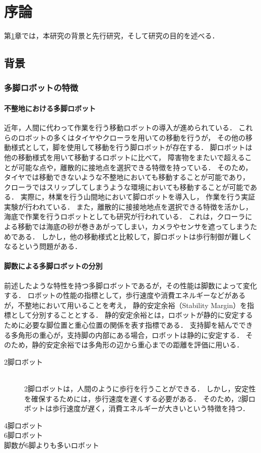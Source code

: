 ﻿
\chapter{序論}\label{chapter:序論}
第\ref{chapter:序論}章では，本研究の背景と先行研究，そして研究の目的を述べる．


\section{背景}
\subsection{多脚ロボットの特徴}
\subsubsection{不整地における多脚ロボット}
近年，人間に代わって作業を行う移動ロボットの導入が進められている．
これらのロボットの多くはタイヤやクローラを用いての移動を行うが，
その他の移動様式として，脚を使用して移動を行う脚ロボットが存在する．
脚ロボットは他の移動様式を用いて移動するロボットに比べて，
障害物をまたいで超えることが可能な点や，離散的に接地点を選択できる特徴を持っている\cite{Locomotion_for_difficult_terrain}．
そのため，タイヤでは移動できないような不整地においても移動することが可能であり，
クローラではスリップしてしまうような環境においても移動することが可能である．
実際に，林業を行う山間地において脚ロボットを導入し，
作業を行う実証実験が行われている\cite{NEDO}．
また，離散的に接接地地点を選択できる特徴を活かし，海底で作業を行うロボットとしても研究が行われている．
これは，クローラによる移動では海底の砂が巻きあがってしまい，カメラやセンサを遮ってしまうためである．
しかし，他の移動様式と比較して，脚ロボットは歩行制御が難しくなるという問題がある．

\subsubsection{脚数による多脚ロボットの分別}
前述したような特性を持つ多脚ロボットであるが，その性能は脚数によって変化する．
ロボットの性能の指標として，歩行速度や消費エネルギーなどがあるが，不整地において用いることを考え，
静的安定余裕\cite{Hirose_Static_stability_criterion}（Stability Margin）を指標として分別することとする．
静的安定余裕とは，ロボットが静的に安定するために必要な脚位置と重心位置の関係を表す指標である．
支持脚を結んでできる多角形の重心が，支持脚の内部にある場合，ロボットは静的に安定する．
そのため，静的安定余裕では多角形の辺から重心までの距離を評価に用いる．
\begin{description}
  \item[2脚ロボット]\mbox{}\\
    2脚ロボットは，人間のように歩行を行うことができる．
    しかし，安定性を確保するためには，歩行速度を遅くする必要がある．
    そのため，2脚ロボットは歩行速度が遅く，消費エネルギーが大きいという特徴を持つ．
  \item[4脚ロボット]
  \item[6脚ロボット]
  \item[脚数が6脚よりも多いロボット] 
\end{description}

